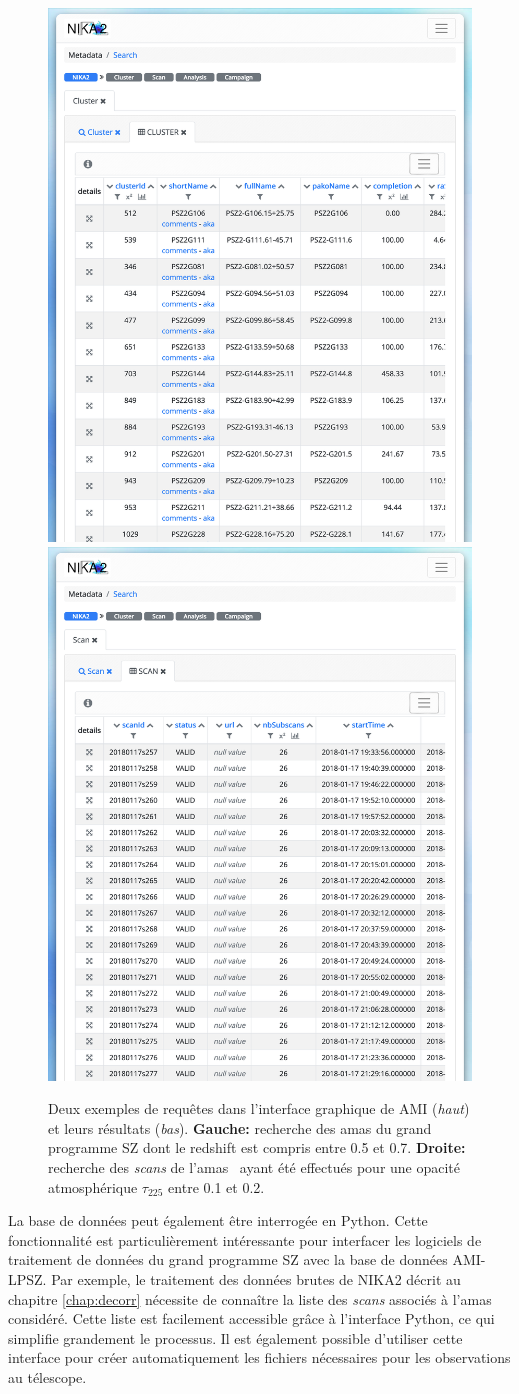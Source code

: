\begin{figure}[t]
    \includegraphics[width=.49\linewidth, trim={0 12cm 0 0}, clip]{Figures/Chap_nk/ami_results_1.png} \hfill
    \includegraphics[width=.49\linewidth, trim={0 12cm 0 0}, clip]{Figures/Chap_nk/ami_results_2.png}
    \caption{
        Deux exemples de requêtes dans l'interface graphique de AMI (\textit{haut}) et leurs résultats (\textit{bas}).
        \textbf{Gauche:} recherche des amas du grand programme SZ dont le redshift est compris entre 0.5 et 0.7.
        \textbf{Droite:} recherche des \textit{scans} de l'amas \act\ ayant été effectués pour une opacité atmosphérique $\tau_{225}$ entre 0.1 et 0.2.
    }
    \label{fig:ami_request}
\end{figure}

La base de données peut également être interrogée en Python.
Cette fonctionnalité est particulièrement intéressante pour interfacer les logiciels de traitement de données du grand programme SZ avec la base de données AMI-LPSZ.
Par exemple, le traitement des données brutes de NIKA2 décrit au chapitre \ref{chap:decorr} nécessite de connaître la liste des \textit{scans} associés à l'amas considéré.
Cette liste est facilement accessible grâce à l'interface Python, ce qui simplifie grandement le processus.
Il est également possible d'utiliser cette interface pour créer automatiquement les fichiers nécessaires pour les observations au télescope.

